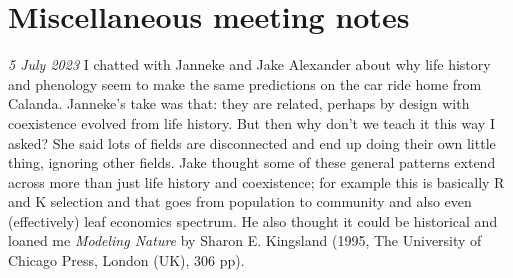 \documentclass[11pt]{article}
\begin{document}
\section{Miscellaneous meeting notes}

\emph{5 July 2023} I chatted with Janneke and Jake Alexander about why life history and phenology seem to make the same predictions on the car ride home from Calanda. Janneke's take was that: they are related, perhaps by design with coexistence evolved from life history. But then why don't we teach it this way I asked? She said lots of fields are disconnected and end up doing their own little thing, ignoring other fields. Jake thought some of these general patterns extend across more than just life history and coexistence; for example this is basically R and K selection and that goes from population to community and also even (effectively) leaf economics spectrum. He also thought it could be historical and loaned me \emph{Modeling Nature} by Sharon E. Kingsland (1995, The University of Chicago Press, London (UK), 306 pp).
\end{document}
